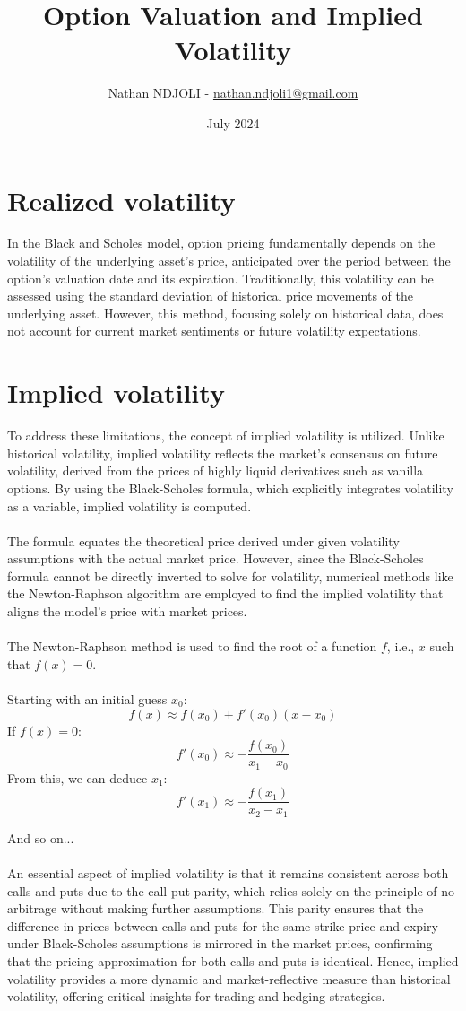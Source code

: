 \documentclass[a4paper,10pt]{article}
\title{Option Valuation and Implied Volatility}
\author{Nathan NDJOLI - \href{mailto:nathan.ndjoli1@gmail.com}{nathan.ndjoli1@gmail.com}}
\date{July 2024}
\begin{document}
\maketitle

\section{Realized volatility}

In the Black and Scholes model, option pricing fundamentally depends on the volatility of the underlying asset's price, anticipated over the period between the option's valuation date and its expiration. Traditionally, this volatility can be assessed using the standard deviation of historical price movements of the underlying asset. However, this method, focusing solely on historical data, does not account for current market sentiments or future volatility expectations.

\section{Implied volatility}

To address these limitations, the concept of implied volatility is utilized. Unlike historical volatility, implied volatility reflects the market's consensus on future volatility, derived from the prices of highly liquid derivatives such as vanilla options. By using the Black-Scholes formula, which explicitly integrates volatility as a variable, implied volatility is computed.\\\\The formula equates the theoretical price derived under given volatility assumptions with the actual market price. However, since the Black-Scholes formula cannot be directly inverted to solve for volatility, numerical methods like the Newton-Raphson algorithm are employed to find the implied volatility that aligns the model's price with market prices.\\\\ The Newton-Raphson method is used to find the root of a function \( f \), i.e., \( x \) such that \( f(x) = 0 \).\\\\Starting with an initial guess \( x_0 \):\[f(x) \approx f(x_0) + f'(x_0)(x - x_0)\]If \( f(x) = 0 \):\[f'(x_0) \approx -\frac{f(x_0)}{x_1 - x_0}\]
From this, we can deduce \( x_1 \):\[f'(x_1) \approx -\frac{f(x_1)}{x_2 - x_1}\]

And so on...\\\\An essential aspect of implied volatility is that it remains consistent across both calls and puts due to the call-put parity, which relies solely on the principle of no-arbitrage without making further assumptions. This parity ensures that the difference in prices between calls and puts for the same strike price and expiry under Black-Scholes assumptions is mirrored in the market prices, confirming that the pricing approximation for both calls and puts is identical. Hence, implied volatility provides a more dynamic and market-reflective measure than historical volatility, offering critical insights for trading and hedging strategies.
\end{document}
